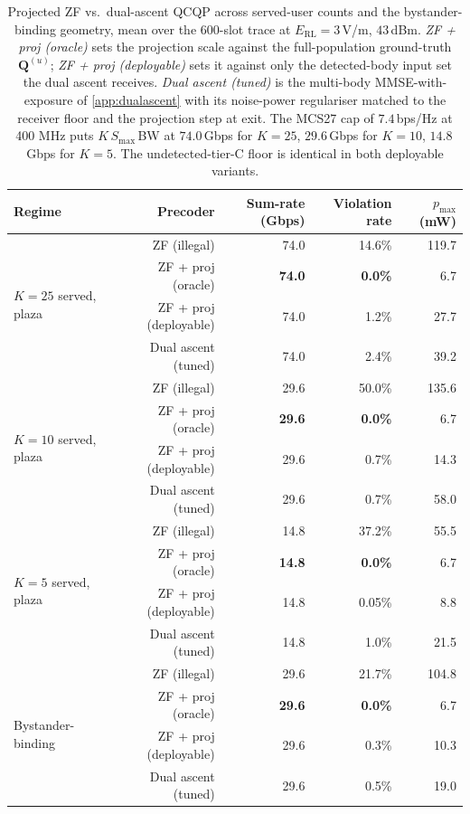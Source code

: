 \documentclass[journal,twocolumn,10pt]{IEEEtran}
\theoremstyle{plain}
\theoremstyle{remark}
\newcommand{\Qmat}{\mathbf{Q}}
\begin{document}
\begin{table}[!t]
\caption{Projected ZF vs.\ dual-ascent QCQP across served-user
counts and the bystander-binding geometry, mean over the $600$-slot
trace at $E_{\mathrm{RL}} = 3\,$V/m, $43\,$dBm. \emph{ZF + proj
(oracle)} sets the projection scale against the full-population
ground-truth $\Qmat^{(u)}$; \emph{ZF + proj (deployable)} sets it
against only the detected-body input set the dual ascent receives.
\emph{Dual ascent (tuned)} is the multi-body MMSE-with-exposure of
\cref{app:dualascent} with its noise-power regulariser matched to
the receiver floor and the projection step at exit. The MCS27 cap
of $7.4\,$bps/Hz at 400 MHz puts $K\,S_{\max}\,$BW at $74.0\,$Gbps
for $K = 25$, $29.6\,$Gbps for $K = 10$, $14.8\,$Gbps for $K = 5$.
The undetected-tier-C floor is identical in both deployable
variants.}
\label{tab:baselines}
\centering
\small
\begin{tabular}{@{}lrrrr@{}}
\toprule
Regime & Precoder & Sum-rate (Gbps) & Violation rate & $p_{\max}$ (mW) \\
\midrule
\multirow{4}{*}{$K = 25$ served, plaza}
 & ZF (illegal) & 74.0 & 14.6\% & 119.7 \\
 & ZF + proj (oracle) & \textbf{74.0} & \textbf{0.0\%} & 6.7 \\
 & ZF + proj (deployable) & 74.0 & 1.2\% & 27.7 \\
 & Dual ascent (tuned) & 74.0 & 2.4\% & 39.2 \\
\midrule
\multirow{4}{*}{$K = 10$ served, plaza}
 & ZF (illegal) & 29.6 & 50.0\% & 135.6 \\
 & ZF + proj (oracle) & \textbf{29.6} & \textbf{0.0\%} & 6.7 \\
 & ZF + proj (deployable) & 29.6 & 0.7\% & 14.3 \\
 & Dual ascent (tuned) & 29.6 & 0.7\% & 58.0 \\
\midrule
\multirow{4}{*}{$K = 5$ served, plaza}
 & ZF (illegal) & 14.8 & 37.2\% & 55.5 \\
 & ZF + proj (oracle) & \textbf{14.8} & \textbf{0.0\%} & 6.7 \\
 & ZF + proj (deployable) & 14.8 & 0.05\% & 8.8 \\
 & Dual ascent (tuned) & 14.8 & 1.0\% & 21.5 \\
\midrule
\multirow{4}{*}{Bystander-binding}
 & ZF (illegal) & 29.6 & 21.7\% & 104.8 \\
 & ZF + proj (oracle) & \textbf{29.6} & \textbf{0.0\%} & 6.7 \\
 & ZF + proj (deployable) & 29.6 & 0.3\% & 10.3 \\
 & Dual ascent (tuned) & 29.6 & 0.5\% & 19.0 \\
\bottomrule
\end{tabular}
\end{table}
\end{document}
